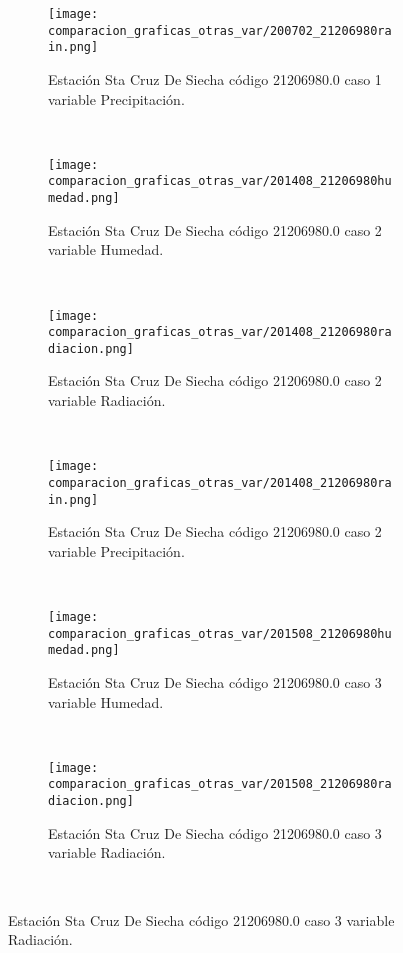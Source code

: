 \begin{figure}[H]
\centering
\begin{subfigure}[normla]{0.4\textwidth}
\caption{Estación Sta Cruz De Siecha código 21206980.0 caso 1 variable Precipitación.}
\texttt{[image: comparacion\_graficas\_otras\_var/200702\_21206980rain.png]}
\end{subfigure}
~
\begin{subfigure}[normla]{0.4\textwidth}
\caption{Estación Sta Cruz De Siecha código 21206980.0 caso 2 variable Humedad.}
\texttt{[image: comparacion\_graficas\_otras\_var/201408\_21206980humedad.png]}
\end{subfigure}
~
\begin{subfigure}[normla]{0.4\textwidth}
\caption{Estación Sta Cruz De Siecha código 21206980.0 caso 2 variable Radiación.}
\texttt{[image: comparacion\_graficas\_otras\_var/201408\_21206980radiacion.png]}
\end{subfigure}
~
\begin{subfigure}[normla]{0.4\textwidth}
\caption{Estación Sta Cruz De Siecha código 21206980.0 caso 2 variable Precipitación.}
\texttt{[image: comparacion\_graficas\_otras\_var/201408\_21206980rain.png]}
\end{subfigure}
~
\begin{subfigure}[normla]{0.4\textwidth}
\caption{Estación Sta Cruz De Siecha código 21206980.0 caso 3 variable Humedad.}
\texttt{[image: comparacion\_graficas\_otras\_var/201508\_21206980humedad.png]}
\end{subfigure}
~
\begin{subfigure}[normla]{0.4\textwidth}
\caption{Estación Sta Cruz De Siecha código 21206980.0 caso 3 variable Radiación.}
\texttt{[image: comparacion\_graficas\_otras\_var/201508\_21206980radiacion.png]}
\end{subfigure}
~
\end{figure}
           

